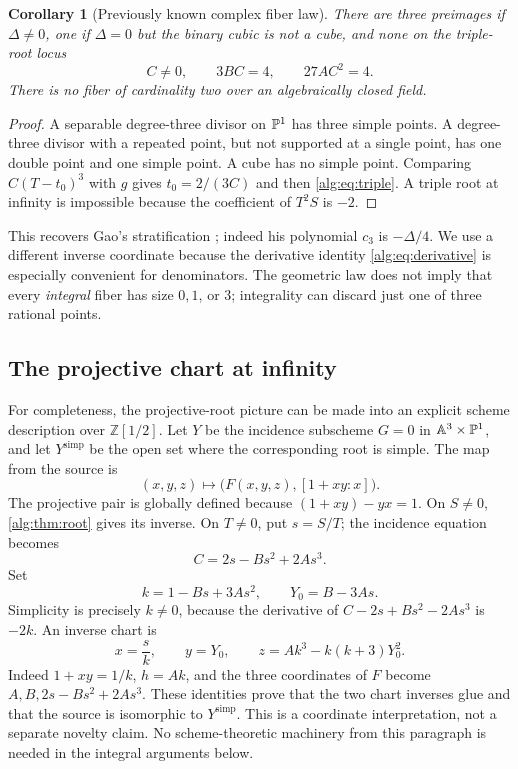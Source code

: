 \documentclass[11pt]{article}
\numberwithin{equation}{section}
\theoremstyle{plain}
\theoremstyle{plain}
\theoremstyle{plain}
\newtheorem{corollary}[corollary]{Corollary}
\theoremstyle{definition}
\theoremstyle{definition}
\theoremstyle{definition}
\theoremstyle{remark}
\newcommand{\Z}{\mathbb Z}\newcommand{\Q}{\mathbb Q}
\begin{document}
\begin{corollary}[Previously known complex fiber law]\label{alg:cor:geometric}
There are three preimages if $\Delta\ne0$, one if $\Delta=0$ but the
binary cubic is not a cube, and none on the triple-root locus
\begin{equation}\label{alg:eq:triple}
 C\ne0,\qquad 3BC=4,\qquad 27AC^2=4.
\end{equation}
There is no fiber of cardinality two over an algebraically closed field.
\end{corollary}
\begin{proof}
A separable degree-three divisor on $\mathbb P^1$ has three simple points.
A degree-three divisor with a repeated point, but not supported at a
single point, has one double point and one simple point. A cube has no simple point. Comparing
$C(T-t_0)^3$ with $g$ gives $t_0=2/(3C)$ and then
\eqref{alg:eq:triple}. A triple root at infinity is impossible because the
coefficient of $T^2S$ is $-2$.
\end{proof}
This recovers Gao's stratification \cite[Theorem 3.4]{gao}; indeed his
polynomial $c_3$ is $-\Delta/4$. We use a different inverse coordinate
because the derivative identity \eqref{alg:eq:derivative} is especially
convenient for denominators. The geometric law does not imply that every
\emph{integral} fiber has size $0,1$, or $3$; integrality can discard just
one of three rational points.

\subsection{The projective chart at infinity}\label{alg:sec:schemechart}
For completeness, the projective-root picture can be made into an
explicit scheme description over $\Z[1/2]$. Let $Y$ be the incidence
subscheme $G=0$ in $\mathbb A^3\times\mathbb P^1$, and let $Y^{\mathrm{simp}}$ be the
open set where the corresponding root is simple.
The map from the source is
\[
 (x,y,z)\longmapsto\bigl(F(x,y,z),[1+xy:x]\bigr).
\]
The projective pair is globally defined because $(1+xy)-yx=1$.
On $S\ne0$, \cref{alg:thm:root} gives its inverse.
On $T\ne0$, put $s=S/T$; the incidence equation becomes
\[
 C=2s-Bs^2+2As^3.
\]
Set
\[
 k=1-Bs+3As^2,\qquad Y_0=B-3As.
\]
Simplicity is precisely $k\ne0$, because the derivative of
$C-2s+Bs^2-2As^3$ is $-2k$. An inverse chart is
\begin{equation}\label{alg:eq:infinitychart}
 x=\frac{s}{k},\qquad y=Y_0,\qquad
 z=Ak^3-k(k+3)Y_0^2.
\end{equation}
Indeed $1+xy=1/k$, $h=Ak$, and the three coordinates of $F$ become
$A,B,2s-Bs^2+2As^3$. These identities prove that the two chart inverses
glue and that the source is isomorphic to $Y^{\mathrm{simp}}$.
This is a coordinate interpretation, not a separate novelty claim.
No scheme-theoretic machinery from this paragraph is needed in the
integral arguments below.
\end{document}
